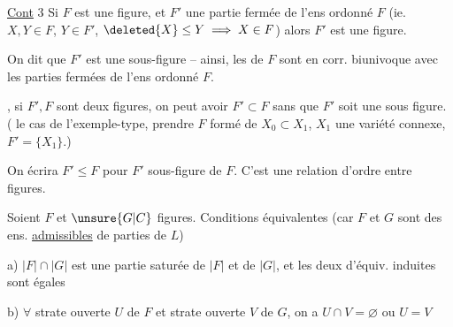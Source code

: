  

\uline{Cont} 3 Si $F$ est une  figure, et $F'$ une partie fermée de l'ens ordonné $F$ (ie. $X,Y\in F$, $Y\in F'$, $\deleted{X}\leq Y\implies X\in F$) alors $F'$ est une figure.

On dit que $F'$ est une sous-figure -- ainsi, les  de $F$ sont en corr. biunivoque avec les parties fermées de l'ens ordonné $F$.

, si $F',F$ sont deux figures, on peut avoir $F'\subset F$ sans que $F'$ soit une sous figure. ( le cas de l'exemple-type, prendre $F$ formé de $X_0\subset X_1$, $X_1$ une variété connexe, $F'=\{X_1\}$.)


On écrira \deleted{$\unsure{\leq|\subset}$} $F'\leq F$ pour $F'$ sous-figure de $F$. C'est une relation d'ordre entre figures.

Soient $F$ et $\unsure{G|C}$  figures. Conditions équivalentes (car $F$ et $G$ sont des ens. \uline{admissibles} de parties de $L$)

a) $|F|\cap|G|$ est une partie saturée de $|F|$ et de $|G|$, et les deux  d'équiv. induites sont égales


b) $\forall$ strate ouverte $U$ de $F$ et strate ouverte $V$ de $G$, on a $U\cap V=\varnothing$ ou $U=V$

